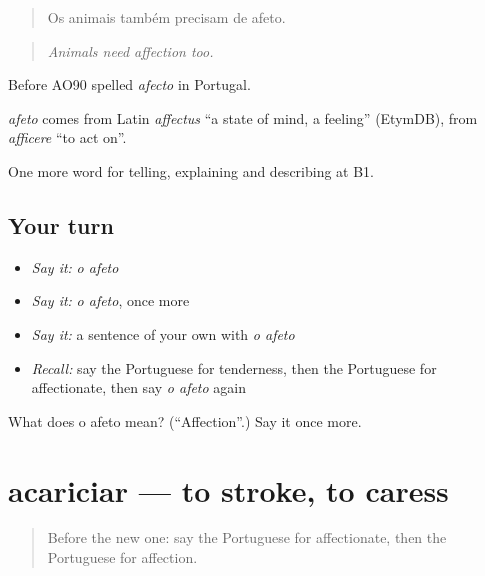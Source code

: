 \begin{quote}
Os animais também precisam de afeto.
\end{quote}

\begin{quote}
\emph{Animals need affection too.}
\end{quote}

Before AO90 spelled \emph{afecto} in Portugal.

\begin{cousinweb}
\emph{afeto} comes from Latin \emph{affectus} \textquotedblleft{}a state of mind, a feeling\textquotedblright{} (EtymDB), from \emph{afficere} \textquotedblleft{}to act on\textquotedblright{}.
\end{cousinweb}

\begin{grammarlens}[title={What you've built}]
One more word for telling, explaining and describing at B1.
\end{grammarlens}

\subsection*{Your turn}
\begin{itemize}
\raggedright
  \item \emph{Say it:} \emph{o afeto}
  \item \emph{Say it:} \emph{o afeto}, once more
  \item \emph{Say it:} a sentence of your own with \emph{o afeto}
  \item \emph{Recall:} say the Portuguese for tenderness, then the Portuguese for affectionate, then say \emph{o afeto} again
\end{itemize}

\begin{tcolorbox}[breakable,colback=teal!4,colframe=teal!35!black,title={Before you move on}]
What does o afeto mean? (\textquotedblleft{}Affection\textquotedblright{}.) Say it once more.
\end{tcolorbox}
\section[acariciar]{acariciar — to stroke, to caress}

\label{lesson:PT-C496-acariciar}



\begin{quote}
Before the new one: say the Portuguese for affectionate, then the Portuguese for affection.
\end{quote}

